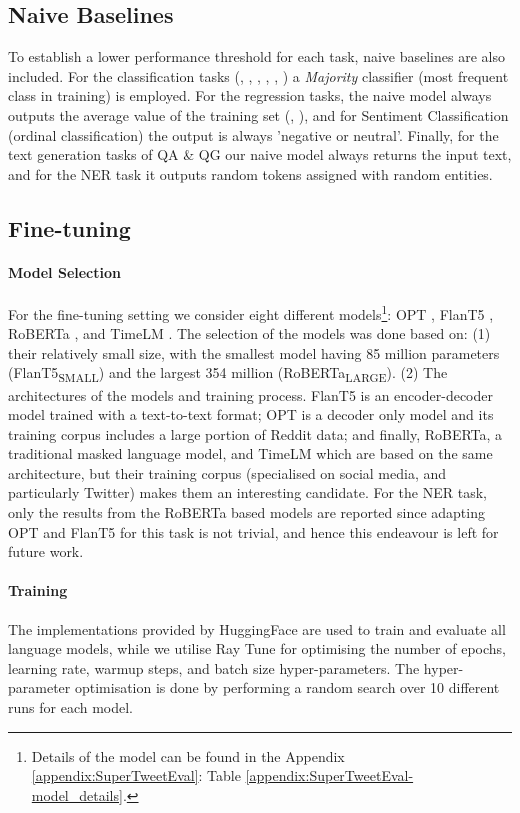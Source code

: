 \subsection{Naive Baselines}
To establish a lower performance threshold for each task, naive baselines are also included. For the classification tasks ({\TweetEmotion}, {\TweetNERD}, {\TempoWiC}, {\TweetTopic}, {\TweetHate}, {\TweetEmoji}) a \textit{Majority} classifier (most frequent class in training) is employed. For the regression tasks, the naive model always outputs the average value of the training set  ({\TweetIntimacy}, {\TweetSimilarity}), and for Sentiment Classification (ordinal classification) the output is always 'negative or neutral’. Finally, for the text generation tasks of QA \& QG our naive model always returns the input text, and for the NER task it outputs random tokens assigned with random entities.


\subsection{Fine-tuning}
\paragraph{Model Selection} For the fine-tuning setting we consider eight different models\footnote{Details of the model can be found in the Appendix \ref{appendix:SuperTweetEval}: Table \ref{appendix:SuperTweetEval-model_details}.}: OPT \cite{zhang2022opt}, FlanT5 \cite{https://doi.org/10.48550/arxiv.2210.11416}, RoBERTa \cite{DBLP:journals/corr/abs-1907-11692}, and TimeLM \cite{loureiro-etal-2022-timelms}. The selection of the models was done based on: (1) their relatively small size, with the smallest model having 85 million parameters (FlanT5\textsubscript{SMALL}) and the largest 354 million (RoBERTa\textsubscript{LARGE}). (2) The architectures of the models and training process. FlanT5 is an encoder-decoder model trained with a text-to-text format; OPT is a decoder only model and its training corpus includes a large portion of Reddit data; and finally, RoBERTa, a traditional masked language model, and TimeLM which are based on the same architecture, but their training corpus (specialised on social media, and particularly Twitter) makes them an interesting candidate. For the NER task, only the results from the RoBERTa based models are reported since adapting OPT and FlanT5 for this task is not trivial, and hence this endeavour is left for future work.

\paragraph{Training}  The implementations provided by HuggingFace \cite{wolf-etal-2020-transformers} are used to train and evaluate all language models, while we utilise Ray Tune \cite{liaw2018tune} for optimising the number of epochs, learning rate, warmup steps, and batch size hyper-parameters. The hyper-parameter optimisation is done by performing a random search over 10 different runs for each model.


